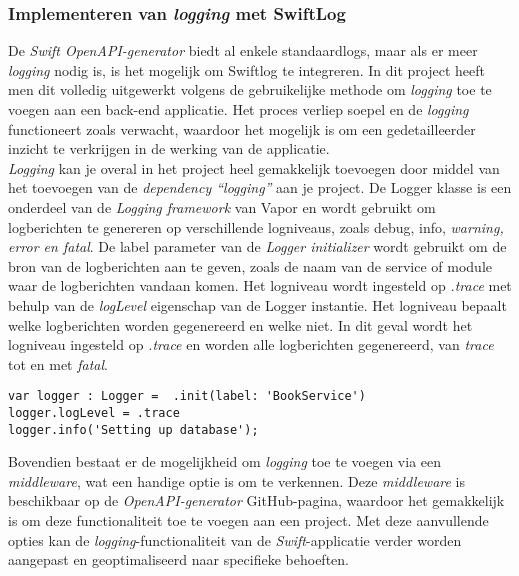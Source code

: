\subsubsection{Implementeren van \textit{logging} met SwiftLog}
De \textit{Swift OpenAPI-generator} biedt al enkele standaardlogs, maar als er meer \textit{logging} nodig is, is het mogelijk om Swiftlog te integreren. In dit project heeft men dit volledig uitgewerkt volgens de gebruikelijke methode om \textit{logging} toe te voegen aan een back-end applicatie. Het proces verliep soepel en de \textit{logging} functioneert zoals verwacht, waardoor het mogelijk is om een gedetailleerder inzicht te verkrijgen in de werking van de applicatie.
 \\
\textit{Logging} kan je overal in het project heel gemakkelijk toevoegen door middel van het toevoegen van de \textit{dependency “logging”} aan je project. De Logger klasse is een onderdeel van de \textit{Logging framework} van Vapor en wordt gebruikt om logberichten te genereren op verschillende logniveaus, zoals debug, info, \textit{warning, error en fatal}. De label parameter van de \textit{Logger initializer} wordt gebruikt om de bron van de logberichten aan te geven, zoals de naam van de service of module waar de logberichten vandaan komen. Het logniveau wordt ingesteld op \textit{.trace} met behulp van de \textit{logLevel} eigenschap van de Logger instantie. Het logniveau bepaalt welke logberichten worden gegenereerd en welke niet. In dit geval wordt het logniveau ingesteld op \textit{.trace} en worden alle logberichten gegenereerd, van \textit{trace} tot en met \textit{fatal}.

\begin{lstlisting}[caption=booksServiceServer file]
var logger : Logger =  .init(label: 'BookService')
logger.logLevel = .trace
logger.info('Setting up database');
\end{lstlisting}

Bovendien bestaat er de mogelijkheid om \textit{logging} toe te voegen via een \textit{middleware}, wat een handige optie is om te verkennen. Deze \textit{middleware} is beschikbaar op de \textit{ OpenAPI-generator} GitHub-pagina, waardoor het gemakkelijk is om deze functionaliteit toe te voegen aan een project. Met deze aanvullende opties kan de \textit{logging}-functionaliteit van de \textit{Swift}-applicatie verder worden aangepast en geoptimaliseerd naar specifieke behoeften.



